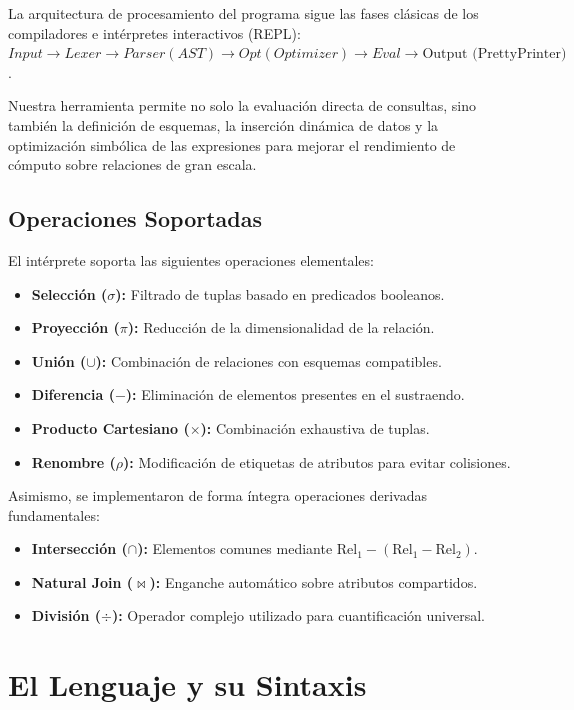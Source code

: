 \documentclass[12pt]{report}
\begin{document}
La arquitectura de procesamiento del programa sigue las fases clásicas de los compiladores e intérpretes interactivos (REPL):\\
$Input \rightarrow Lexer \rightarrow Parser (AST) \rightarrow Opt (Optimizer) \rightarrow Eval \rightarrow \text{Output (PrettyPrinter)}$.

Nuestra herramienta permite no solo la evaluación directa de consultas, sino también la definición de esquemas, la inserción dinámica de datos y la optimización simbólica de las expresiones para mejorar el rendimiento de cómputo sobre relaciones de gran escala.

\section{Operaciones Soportadas}
El intérprete soporta las siguientes operaciones elementales:
\begin{itemize}
    \item \textbf{Selección ($\sigma$):} Filtrado de tuplas basado en predicados booleanos.
    \item \textbf{Proyección ($\pi$):} Reducción de la dimensionalidad de la relación.
    \item \textbf{Unión ($\cup$):} Combinación de relaciones con esquemas compatibles.
    \item \textbf{Diferencia ($-$):} Eliminación de elementos presentes en el sustraendo.
    \item \textbf{Producto Cartesiano ($\times$):} Combinación exhaustiva de tuplas.
    \item \textbf{Renombre ($\rho$):} Modificación de etiquetas de atributos para evitar colisiones.
\end{itemize}

Asimismo, se implementaron de forma íntegra operaciones derivadas fundamentales:
\begin{itemize}
    \item \textbf{Intersección ($\cap$):} Elementos comunes mediante $\text{Rel}_1 - (\text{Rel}_1 - \text{Rel}_2)$.
    \item \textbf{Natural Join ($\bowtie$):} Enganche automático sobre atributos compartidos.
    \item \textbf{División ($\div$):} Operador complejo utilizado para cuantificación universal.
\end{itemize}

\chapter{El Lenguaje y su Sintaxis}
\end{document}
